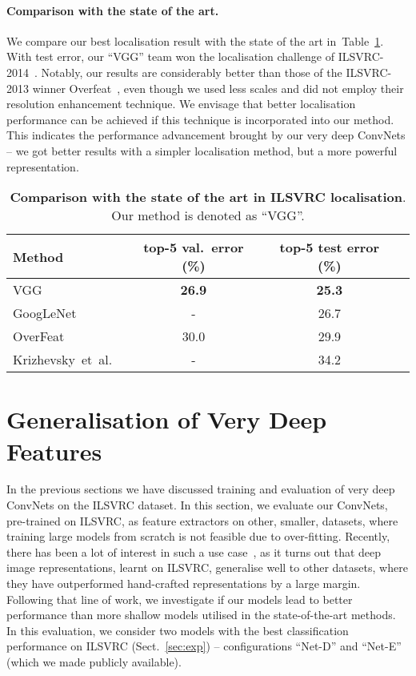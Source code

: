\documentclass{article} \usepackage{iclr2015,times}
\makeatletter
\newcommand{\tblref}[1]{Table~\ref{#1}}
\newcommand{\sref}[1]{Sect.~\ref{#1}}
\newcommand*{\etal}{et~al.\@\xspace}
\makeatother
\begin{document}
\paragraph{Comparison with the state of the art.}

We compare our best localisation result with the state of the art in~\tblref{tab:loc_SOA}.
With  test error, our ``VGG'' team won the localisation challenge of ILSVRC-2014~\citep{Russakovsky14}.
Notably, our results are considerably better than those of the ILSVRC-2013 winner Overfeat~\citep{Sermanet14}, even though we used less scales and did not employ
their resolution enhancement technique. 
We envisage that better localisation performance can be achieved if this technique is incorporated into our method.
This indicates the performance advancement brought by our very deep ConvNets -- we got better results with a simpler localisation method, but a more powerful representation.

\begin{table}[htb]
\setlength{\tabcolsep}{2pt}
\small
\centering
\caption{\textbf{Comparison with the state of the art in ILSVRC localisation}. Our method is denoted as ``VGG''.
}
\begin{tabular}{|l|c|c|c|} \hline
Method & top-5 val.\ error (\%) & top-5 test error (\%) \\ \hline
VGG & \textbf{26.9} & \textbf{25.3} \\ \hline
GoogLeNet~\citep{Szegedy14} & - & 26.7 \\ \hline
OverFeat~\citep{Sermanet14} & 30.0 & 29.9 \\ \hline
Krizhevsky~\etal~\citep{Krizhevsky12} & - & 34.2 \\ \hline
\end{tabular}
\label{tab:loc_SOA}
\end{table}


\section{Generalisation of Very Deep Features}
\label{sec:dataset_transfer}
In the previous sections we have discussed training and evaluation of very deep ConvNets on the ILSVRC dataset. In this section, we evaluate our ConvNets, pre-trained on ILSVRC, as feature extractors on other, smaller, datasets, where training large models from scratch is not feasible due to over-fitting. Recently, there has been a lot of interest in such a use case~\citep{Zeiler13,Donahue13,Razavian14,Chatfield14}, as it turns out that deep image representations, learnt on ILSVRC, generalise well to other datasets, where they have outperformed hand-crafted representations by a large margin. Following that line of work, we investigate if our models lead to better performance than more shallow models utilised in the state-of-the-art methods.
In this evaluation, we consider two models with the best classification performance on ILSVRC (\sref{sec:exp}) -- configurations ``Net-D'' and ``Net-E'' (which we made publicly available).
\end{document}
